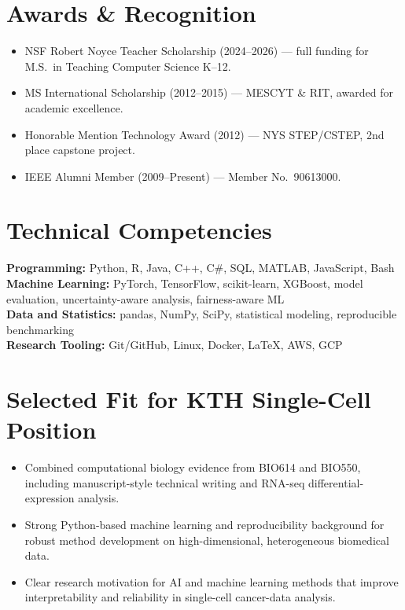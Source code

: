 \documentclass[11pt]{article}
\begin{document}
\section{Awards \& Recognition}
\begin{itemize}
  \item NSF Robert Noyce Teacher Scholarship (2024--2026) --- full funding for M.S.\ in Teaching Computer Science K--12.
  \item MS International Scholarship (2012--2015) --- MESCYT \& RIT, awarded for academic excellence.
  \item Honorable Mention Technology Award (2012) --- NYS STEP/CSTEP, 2nd place capstone project.
  \item IEEE Alumni Member (2009--Present) --- Member No.\ 90613000.
\end{itemize}

\section{Technical Competencies}
\textbf{Programming:} Python, R, Java, C++, C\#, SQL, MATLAB, JavaScript, Bash\\
\textbf{Machine Learning:} PyTorch, TensorFlow, scikit-learn, XGBoost, model evaluation, uncertainty-aware analysis, fairness-aware ML\\
\textbf{Data and Statistics:} pandas, NumPy, SciPy, statistical modeling, reproducible benchmarking\\
\textbf{Research Tooling:} Git/GitHub, Linux, Docker, LaTeX, AWS, GCP

\section{Selected Fit for KTH Single-Cell Position}
\begin{itemize}
  \item Combined computational biology evidence from BIO614 and BIO550, including manuscript-style technical writing and RNA-seq differential-expression analysis.
  \item Strong Python-based machine learning and reproducibility background for robust method development on high-dimensional, heterogeneous biomedical data.
  \item Clear research motivation for AI and machine learning methods that improve interpretability and reliability in single-cell cancer-data analysis.
\end{itemize}
\end{document}
